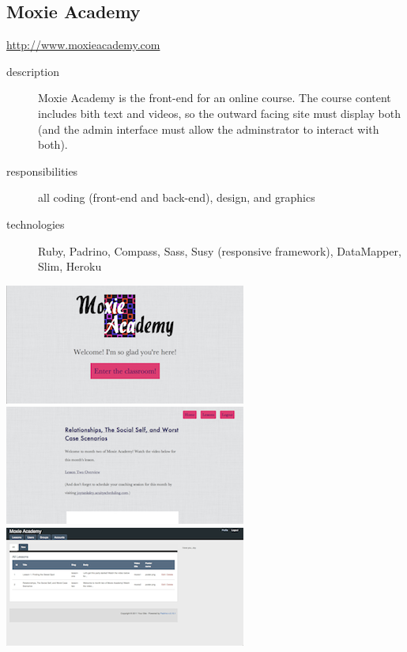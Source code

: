 \documentclass{article}
\begin{document}
\subsection{Moxie Academy} %
\label{sub:Moxie Academy}

\href{http://www.moxieacademy.com}{http://www.moxieacademy.com}

\begin{description}
  \item[description] Moxie Academy is the front-end for an online 
    course.  The course content includes bith text and videos, so the 
    outward facing site must display both (and the admin interface 
    must allow the adminstrator to interact with both).
  \item[responsibilities] all coding (front-end and back-end), design, and graphics
  \item[technologies] Ruby, Padrino, Compass, Sass, Susy (responsive framework), DataMapper, Slim, Heroku
\end{description}

\includegraphics[scale=.5]{../source/images/portfolio/moxie-homepage-sm.png}
\includegraphics[scale=.5]{../source/images/portfolio/moxie-lesson-sm.png}
\includegraphics[scale=.5]{../source/images/portfolio/moxie-admin-sm.png}
\end{document}
